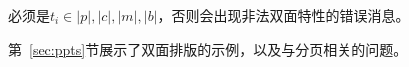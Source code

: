 % 
% 
% 
必须是$t_i\in{|p|,|c|,|m|,|b|}$，否则会出现非法双面特性的错误消息。

第~\ref{sec:ppts}节展示了双面排版的示例，以及与\parapag{}分页相关的问题。
% 
% 
% 

